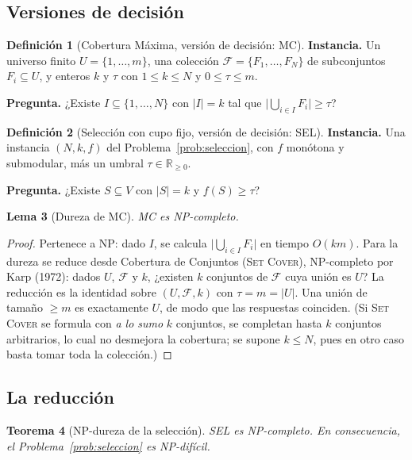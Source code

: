 \documentclass[11pt,a4paper]{article}
\theoremstyle{definition}
\newtheorem{definicion}{Definición}[section]
\theoremstyle{plain}
\newtheorem{teorema}[definicion]{Teorema}
\newtheorem{lema}[definicion]{Lema}
\newcommand{\R}{\mathbb{R}}
\begin{document}
\subsection{Versiones de decisión}

\begin{definicion}[Cobertura Máxima, versión de decisión: \textsc{MC}]
\textbf{Instancia.} Un universo finito $U=\{1,\dots,m\}$, una colección
$\mathcal{F}=\{F_1,\dots,F_N\}$ de subconjuntos $F_i\subseteq U$, y enteros
$k$ y $\tau$ con $1\le k\le N$ y $0\le\tau\le m$.

\textbf{Pregunta.} ¿Existe $I\subseteq\{1,\dots,N\}$ con $|I|=k$ tal que
$\bigl|\bigcup_{i\in I}F_i\bigr|\ge\tau$?
\end{definicion}

\begin{definicion}[Selección con cupo fijo, versión de decisión: \textsc{SEL}]
\textbf{Instancia.} Una instancia $(N,k,f)$ del
Problema~\ref{prob:seleccion}, con $f$ monótona y submodular, más un umbral
$\tau\in\R_{\ge0}$.

\textbf{Pregunta.} ¿Existe $S\subseteq V$ con $|S|=k$ y $f(S)\ge\tau$?
\end{definicion}

\begin{lema}[Dureza de \textsc{MC}]\label{lem:mc}
\textsc{MC} es NP-completo.
\end{lema}

\begin{proof}
Pertenece a NP: dado $I$, se calcula $\bigl|\bigcup_{i\in I}F_i\bigr|$ en tiempo
$O(km)$. Para la dureza se reduce desde Cobertura de Conjuntos
(\textsc{Set Cover}), NP-completo por Karp (1972): dados $U$, $\mathcal{F}$ y
$k$, ¿existen $k$ conjuntos de $\mathcal{F}$ cuya unión es $U$? La reducción es
la identidad sobre $(U,\mathcal{F},k)$ con $\tau=m=|U|$. Una unión de tamaño
$\ge m$ es exactamente $U$, de modo que las respuestas coinciden. (Si
\textsc{Set Cover} se formula con \emph{a lo sumo} $k$ conjuntos, se
completan hasta $k$ conjuntos arbitrarios, lo cual no desmejora la cobertura;
se supone $k\le N$, pues en otro caso basta tomar toda la colección.)
\end{proof}

\subsection{La reducción}

\begin{teorema}[NP-dureza de la selección]\label{teo:nphard}
\textsc{SEL} es NP-completo. En consecuencia, el Problema~\ref{prob:seleccion}
es NP-difícil.
\end{teorema}
\end{document}
